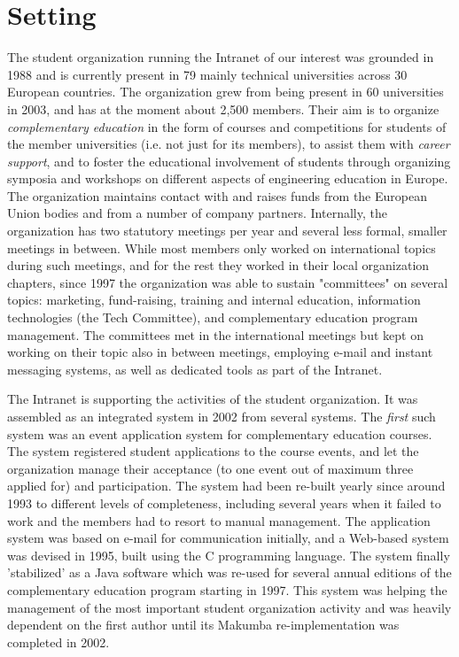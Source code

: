 \documentclass{acm_proc_article-sp}
\begin{document}

\section{Setting}\label{sec:setting}
The student organization running the Intranet of our interest was grounded in 1988 and is currently present in 79 mainly technical universities across 30 European countries. The organization grew from being present in 60 universities in 2003, and has at the moment about 2,500 members. Their aim is to organize {\it complementary education} in the form of courses and competitions for students of the member universities (i.e. not just for its members), to assist them with {\it career support}, and to foster the educational involvement of students through organizing symposia and workshops on different aspects of engineering education in Europe.
The organization maintains contact with and raises funds from the European Union bodies and from a number of company partners. Internally, the organization has two statutory meetings per year and several less formal, smaller meetings in between. While most members only worked on international topics during such meetings, and for the rest they worked in their local organization chapters, since 1997 the organization was able to sustain "committees" on several topics: marketing, fund-raising, training and internal education, information technologies (the Tech Committee), and complementary education program management. The committees met in the international meetings but kept on working on their topic also in between meetings, employing e-mail and instant messaging systems, as well as dedicated tools as part of the Intranet.

The Intranet is supporting the activities of the student organization. It was assembled as an integrated system in 2002 from several systems. The {\it first} such system was an event application system for complementary education courses. The system registered student applications to the course events, and let the organization manage their acceptance (to one event out of maximum three applied for) and participation. The system had been re-built yearly since around 1993 to different levels of completeness, including several years when it failed to work and the members had to resort to manual management. The application system was based on e-mail for communication initially, and a Web-based system was devised in 1995, built using the C programming language. The system finally 'stabilized' as a Java software which was re-used for several annual editions of the complementary education program starting in 1997. This system was helping the management of the most important student organization activity and was heavily dependent on the first author until its Makumba re-implementation was completed in 2002.
\end{document}
